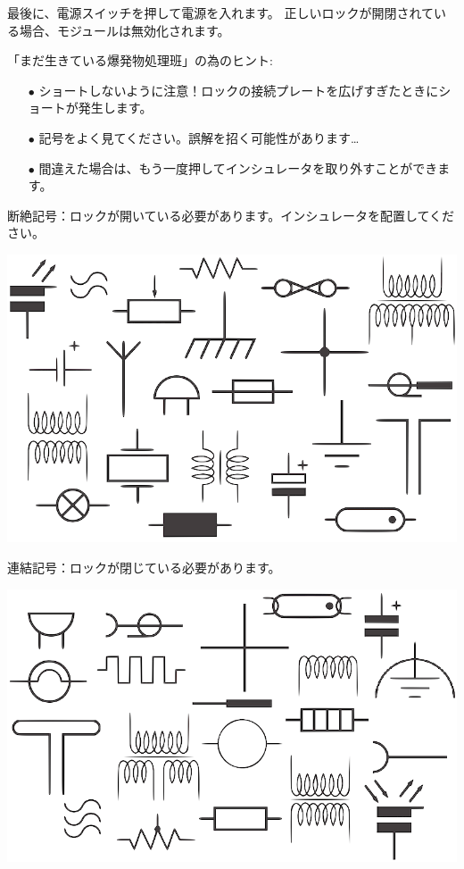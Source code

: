 最後に{、}電源スイッチを押して電源を入れます。 正しいロックが開閉されている場合{、}モジュールは無効化されます。

「まだ生きている爆発物処理班」の為のヒント:
\begin{itemize}
    \item[$\bullet$] ショートしないように注意！ロックの接続プレートを広げすぎたときにショートが発生します。
    \item[$\bullet$] 記号をよく見てください。誤解を招く可能性があります…
    \item[$\bullet$] 間違えた場合は{、}もう一度押してインシュレータを取り外すことができます。
\end{itemize}

\newpage

{\large 断絶記号：ロックが開いている必要があります。インシュレータを配置してください。}
\begin{center}
    \includegraphics[width=\textwidth]{images/14.png}
\end{center}

{\large 連結記号：ロックが閉じている必要があります。}
\begin{center}
    \includegraphics[width=\textwidth]{images/15.png}
\end{center}

